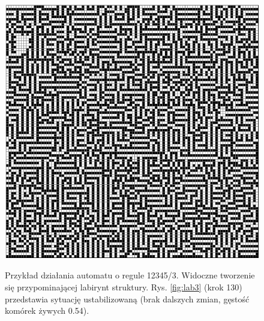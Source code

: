 \documentclass[12pt] {article}
\begin{document}
\begin{figure}[H]
\begin{minipage}[t]{.3\textwidth}
        \label{fig:lab2}
    \end{minipage}
    \hfill
    \begin{minipage}[t]{.3\textwidth}
        \centering
        \includegraphics[width=\textwidth]{res/lab_130.png}
        \label{fig:lab3}
    \end{minipage}
    \caption{Przykład działania automatu o regule 12345/3. Widoczne tworzenie się przypominającej labirynt struktury. Rys. \ref{fig:lab3} (krok 130) przedstawia sytuację ustabilizowaną (brak dalszych zmian, gęstość komórek żywych 0.54).}
    \label{fig:lab}
\end{figure}
\end{document}
